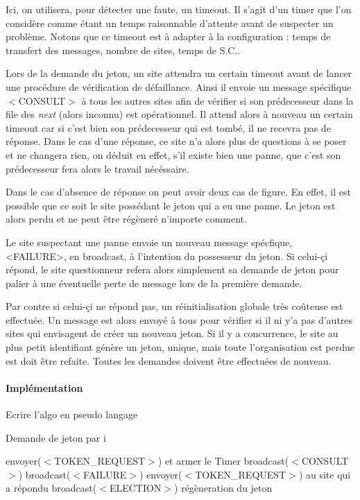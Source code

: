 \documentclass[a4paper,12pt]{article}
\newcommand{\next}{\textit{next} }
\begin{document}
Ici, on utilisera, pour détecter une faute, un timeout. Il s'agit d'un timer que l'on considère comme étant un temps raisonnable d'attente avant de suspecter un problème. Notons que ce timeout est à adapter à la configuration : temps de transfert des messages, nombre de sites, temps de S.C..

Lors de la demande du jeton, un site attendra un certain timeout avant de lancer une procédure de vérification de défaillance. Ainsi il envoie un message spécifique $<$CONSULT$>$ à tous les autres sites afin de vérifier si son prédecesseur dans la file des \next (alors inconnu) est opérationnel. Il attend alors à nouveau un certain timeout car si c'est bien son prédecesseur qui est tombé, il ne recevra pas de réponse.
Dans le cas d'une réponse, ce site n'a alors plus de questions à se poser et ne changera rien, on déduit en effet, s'il existe bien une panne, que c'est son prédecesseur fera alors le travail nécéssaire. 

Dans le cas d'absence de réponse on peut avoir deux cas de figure. En effet, il est possible que ce soit le site possédant le jeton qui a eu une panne. Le jeton est alors perdu et ne peut être régèneré n'importe comment.

Le site suspectant une panne envoie un nouveau message spécfique, <FAILURE>, en broadcast, à l'intention du possesseur du jeton. Si celui-çi répond, le site questionneur refera alors simplement sa demande de jeton pour palier à une éventuelle perte de message lors de la première demande.

Par contre si celui-çi ne répond pas, un réinitialisation globale très coûteuse est effectuée. Un message est alors envoyé à tous pour vérifier si il ni y'a pas d'autres sites qui envisagent de créer un nouveau jeton. Si il y a concurrence, le site au plus petit identifiant génère un jeton, unique, mais toute l'organisation est perdue est doit être refaite. Toutes les demandes doivent être effectuées de nouveau.
 
\paragraph{Implémentation}

Ecrire l'algo en pseudo langage

\begin{algorithm}[t]
\caption{Demande de jeton par i}
\label{algo_naimi_trehel_ext_TK}
\begin{algorithmic}[1]

\STATE envoyer($<$TOKEN\_REQUEST$>$) et armer le Timer
  \STATE broadcast($<$CONSULT$>$)
    \STATE broadcast($<$FAILURE$>$)
      \STATE envoyer($<$TOKEN\_REQUEST$>$) au site qui a répondu
    \ELSE
      \STATE broadcast($<$ELECTION$>$)
	\STATE régèneration du jeton
      \ENDIF
    \ENDIF
  \ENDIF
\ENDIF
\end{algorithmic}
\end{algorithm}
\end{document}

